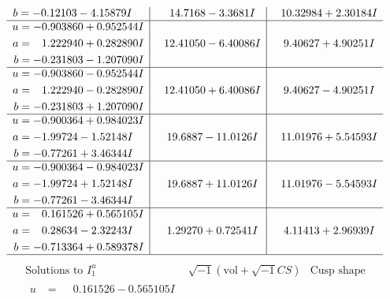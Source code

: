 \documentclass[1p]{elsarticle_modified}
\theoremstyle{definition}
\newcommand{\I}{\sqrt{-1}}
\begin{document}
$$\begin{array}{c|c|c}
\begin{aligned}
b &= -0.12103 - 4.15879 I\end{aligned}
 & \phantom{-}14.7168 - 3.3681 I & \phantom{-}10.32984 + 2.30184 I \\ \hline\begin{aligned}
u &= -0.903860 + 0.952544 I \\
a &= \phantom{-}1.222940 + 0.282890 I \\
b &= -0.231803 - 1.207090 I\end{aligned}
 & \phantom{-}12.41050 - 6.40086 I & \phantom{-}9.40627 + 4.90251 I \\ \hline\begin{aligned}
u &= -0.903860 - 0.952544 I \\
a &= \phantom{-}1.222940 - 0.282890 I \\
b &= -0.231803 + 1.207090 I\end{aligned}
 & \phantom{-}12.41050 + 6.40086 I & \phantom{-}9.40627 - 4.90251 I \\ \hline\begin{aligned}
u &= -0.900364 + 0.984023 I \\
a &= -1.99724 - 1.52148 I \\
b &= -0.77261 + 3.46344 I\end{aligned}
 & \phantom{-}19.6887 - 11.0126 I & \phantom{-}11.01976 + 5.54593 I \\ \hline\begin{aligned}
u &= -0.900364 - 0.984023 I \\
a &= -1.99724 + 1.52148 I \\
b &= -0.77261 - 3.46344 I\end{aligned}
 & \phantom{-}19.6887 + 11.0126 I & \phantom{-}11.01976 - 5.54593 I \\ \hline\begin{aligned}
u &= \phantom{-}0.161526 + 0.565105 I \\
a &= \phantom{-}0.28634 - 2.32243 I \\
b &= -0.713364 + 0.589378 I\end{aligned}
 & \phantom{-}1.29270 + 0.72541 I & \phantom{-}4.11413 + 2.96939 I\\
 \hline 
 \end{array}$$\newpage$$\begin{array}{c|c|c}  
\text{Solutions to }I^u_{1}& \I (\text{vol} + \sqrt{-1}CS) & \text{Cusp shape}\\
 \hline 
\begin{aligned}
u &= \phantom{-}0.161526 - 0.565105 I \\

\end{aligned}
\end{array}$$
\end{document}
